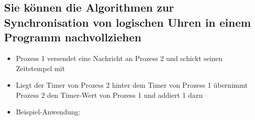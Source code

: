 \subsection{Sie können die Algorithmen zur Synchronisation von logischen Uhren in einem Programm nachvollziehen}

\begin{itemize}
	\item Prozess 1 versendet eine Nachricht an Prozess 2 und schickt seinen Zeitstempel mit
	\item Liegt der Timer von Prozess 2 hinter dem Timer von Prozess 1 übernimmt Prozess 2 den Timer-Wert von Prozess 1 und addiert 1 dazu
	\item Beispiel-Anwendung:
	
	
\end{itemize}
